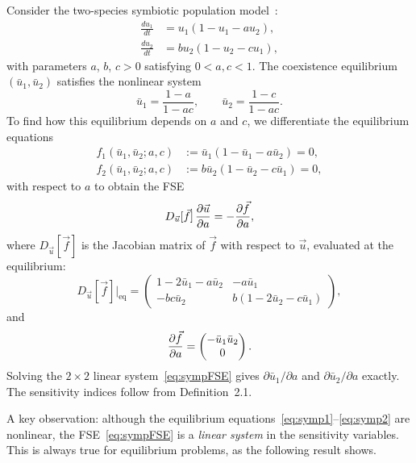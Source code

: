 Consider the two-species symbiotic population model~\cite{murray2007mathematical}:
\begin{align}
  \frac{du_1}{dt} &= u_1(1 - u_1 - au_2), \label{eq:symp1}\\
  \frac{du_2}{dt} &= bu_2(1 - u_2 - cu_1), \label{eq:symp2}
\end{align}
with parameters $a$, $b$, $c > 0$ satisfying $0 < a, c < 1$.
The coexistence equilibrium $(\bar{u}_1, \bar{u}_2)$ satisfies
the nonlinear system
\begin{equation}
  \bar{u}_1 = \frac{1-a}{1-ac}, \qquad \bar{u}_2 = \frac{1-c}{1-ac}.
  \label{eq:sympeq}
\end{equation}
To find how this equilibrium depends on $a$ and $c$,
we differentiate the equilibrium equations
\begin{align*}
  f_1(\bar{u}_1, \bar{u}_2; a, c) &:= \bar{u}_1(1 - \bar{u}_1 - a\bar{u}_2) = 0, \\
  f_2(\bar{u}_1, \bar{u}_2; a, c) &:= b\bar{u}_2(1 - \bar{u}_2 - c\bar{u}_1) = 0,
\end{align*}
with respect to $a$ to obtain the FSE
\begin{equation}
  D_{\vec{u}}[\vec{f}]\,\frac{\partial \vec{u}}{\partial a} = -\frac{\partial \vec{f}}{\partial a},
  \label{eq:sympFSE}
\end{equation}
where $D_{\vec{u}}[\vec{f}]$ is the Jacobian matrix of $\vec{f}$
with respect to $\vec{u}$, evaluated at the equilibrium:
\begin{equation}
  D_{\vec{u}}[\vec{f}]\big|_{\text{eq}} =
  \begin{pmatrix}
    1 - 2\bar{u}_1 - a\bar{u}_2 & -a\bar{u}_1 \\
    -bc\bar{u}_2 & b(1-2\bar{u}_2-c\bar{u}_1)
  \end{pmatrix},
  \label{eq:sympJac}
\end{equation}
and
\[
  \frac{\partial \vec{f}}{\partial a} = \begin{pmatrix} -\bar{u}_1\bar{u}_2 \\ 0 \end{pmatrix}.
\]
Solving the $2\times 2$ linear system~\eqref{eq:sympFSE}
gives $\partial\bar{u}_1/\partial a$ and $\partial\bar{u}_2/\partial a$
exactly. The sensitivity indices follow from Definition~2.1.

A key observation: although the equilibrium equations~\eqref{eq:symp1}--\eqref{eq:symp2}
are nonlinear, the FSE~\eqref{eq:sympFSE} is a \emph{linear system}
in the sensitivity variables.
This is always true for equilibrium problems, as the following
result shows.


